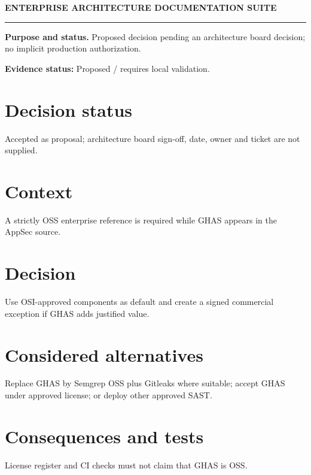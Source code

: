 \documentclass[10pt,letterpaper]{article}
\begin{document}
\begin{center}
{\large\bfseries\color{teal} ENTERPRISE ARCHITECTURE DOCUMENTATION SUITE}\par
{}\par
{}\par
\end{center}
\vspace{8pt}\hrule\vspace{12pt}
\textbf{Purpose and status.} Proposed decision pending an architecture board decision; no implicit production authorization.\par
\textbf{Evidence status:} Proposed / requires local validation.\par
\section{Decision status}
Accepted as proposal; architecture board sign-off, date, owner and ticket are not supplied.\par
\section{Context}
A strictly OSS enterprise reference is required while GHAS appears in the AppSec source.\par
\section{Decision}
Use OSI-approved components as default and create a signed commercial exception if GHAS adds justified value.\par
\section{Considered alternatives}
Replace GHAS by Semgrep OSS plus Gitleaks where suitable; accept GHAS under approved license; or deploy other approved SAST.\par
\section{Consequences and tests}
License register and CI checks must not claim that GHAS is OSS.\par
\end{document}
